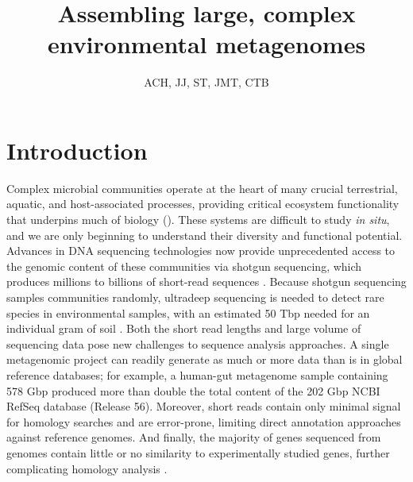 \documentclass[11pt]{article} %
\begin{document}
\title{Assembling large, complex environmental metagenomes}
\author{ACH, JJ, ST, JMT, CTB} 
\maketitle

\section{Introduction}  
Complex microbial communities operate at the heart of many crucial
terrestrial, aquatic, and host-associated processes, providing
critical ecosystem functionality that underpins much of biology
(\cite{Arumugam:2011p735,Hess:2011p686,Iverson:2012p1281,
  Mackelprang:2011p1087,Qin:2010p189,Tringe:2005p174,Venter:2004p170}).
These systems are difficult to study {\em in situ}, and we are only
beginning to understand their diversity and functional potential.
Advances in DNA sequencing technologies now provide unprecedented
access to the genomic content of these communities via shotgun
sequencing, which produces millions to billions of short-read
sequences \cite{Hess:2011p686,Mackelprang:2011p1087,Qin:2010p189}.
Because shotgun sequencing samples communities randomly, ultradeep
sequencing is needed to detect rare species in environmental samples,
with an estimated 50 Tbp needed for an individual gram of soil
\cite{Gans:2005p1365}.  Both the short read lengths and large volume
of sequencing data pose new challenges to sequence analysis
approaches.  A single metagenomic project can readily generate as much
or more data than is in global reference databases; for example, a
human-gut metagenome sample containing 578 Gbp \cite{Qin:2010p189}
produced more than double the total content of the 202 Gbp NCBI RefSeq
database (Release 56).  Moreover, short reads contain only minimal
signal for homology searches and are error-prone, limiting direct
annotation approaches against reference genomes.  And finally, the
majority of genes sequenced from genomes contain little or no
similarity to experimentally studied genes, further complicating
homology analysis \cite{Arumugam:2011p735,Qin:2010p189}.
\end{document}
